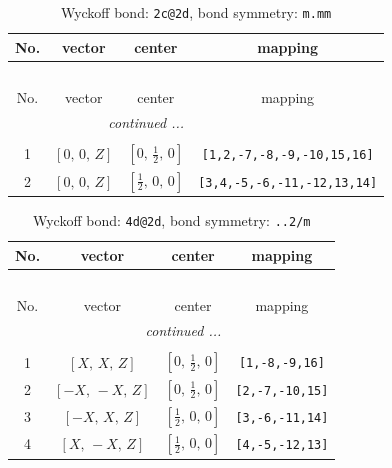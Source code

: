 \documentclass[fleqn,8pt]{jsarticle}
\begin{document}
\begin{longtable}{cccc}
\caption{Wyckoff bond: {\tt 2c@2d}, bond symmetry: {\tt m.mm}}
 \\
 \hline \hline
No. & vector & center & mapping \\ \hline \endfirsthead

\multicolumn{3}{l}{\tablename\ \thetable{}} \\
 \hline \hline
No. & vector & center & mapping \\ \hline \endhead

 \hline \hline
\multicolumn{3}{r}{\footnotesize\it continued ...} \\ \endfoot

 \hline \hline
\multicolumn{3}{r}{} \\ \endlastfoot

1 & $\left[ 0,\, 0,\, Z \right]$ & $\left[ 0,\, \frac{1}{2},\, 0 \right]$ & {\tt [1,2,-7,-8,-9,-10,15,16]} \\ \hline
2 & $\left[ 0,\, 0,\, Z \right]$ & $\left[ \frac{1}{2},\, 0,\, 0 \right]$ & {\tt [3,4,-5,-6,-11,-12,13,14]} \\
\end{longtable}
\renewcommand{\arraystretch}{1.2}
\begin{longtable}{cccc}
\caption{Wyckoff bond: {\tt 4d@2d}, bond symmetry: {\tt ..2/m}}
 \\
 \hline \hline
No. & vector & center & mapping \\ \hline \endfirsthead

\multicolumn{3}{l}{\tablename\ \thetable{}} \\
 \hline \hline
No. & vector & center & mapping \\ \hline \endhead

 \hline \hline
\multicolumn{3}{r}{\footnotesize\it continued ...} \\ \endfoot

 \hline \hline
\multicolumn{3}{r}{} \\ \endlastfoot

1 & $\left[ X,\, X,\, Z \right]$ & $\left[ 0,\, \frac{1}{2},\, 0 \right]$ & {\tt [1,-8,-9,16]} \\ \hline
2 & $\left[ - X,\, - X,\, Z \right]$ & $\left[ 0,\, \frac{1}{2},\, 0 \right]$ & {\tt [2,-7,-10,15]} \\ \hline
3 & $\left[ - X,\, X,\, Z \right]$ & $\left[ \frac{1}{2},\, 0,\, 0 \right]$ & {\tt [3,-6,-11,14]} \\ \hline
4 & $\left[ X,\, - X,\, Z \right]$ & $\left[ \frac{1}{2},\, 0,\, 0 \right]$ & {\tt [4,-5,-12,13]} \\
\end{longtable}
\end{document}
